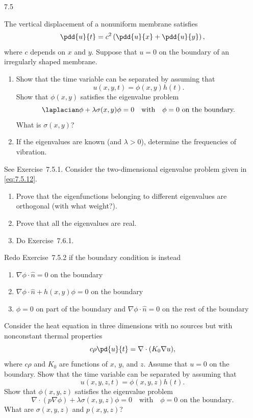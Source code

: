 \begin{exercises}{7.5}

\item The vertical displacement of a nonuniform membrane satisfies
\[
\pdd{u}{t} = c^2\left(\pdd{u}{x} + \pdd{u}{y}\right),
\]
where $c$ depends on $x$ and $y$.  Suppose that $u = 0$ on the boundary of an irregularly shaped membrane.

\begin{enumerate}
\item[(a)] Show that the time variable can be separated by assuming that
\[
u(x,y,t) = \phi(x,y)h(t).
\]
Show that $\phi(x,y)$ satisfies the eigenvalue problem
\begin{equation}
\laplacian\phi + \lambda\sigma(x,y)\phi = 0 \quad\text{with}\quad \phi = 0 \text{ on the boundary.}
\label{eq:7.5.12}
\end{equation}
What is $\sigma(x,y)$?

\item[(b)] If the eigenvalues are known (and $\lambda > 0$), determine the frequencies of vibration.
\end{enumerate}

\item See Exercise~7.5.1.  Consider the two-dimensional eigenvalue problem given in \eqref{eq:7.5.12}.

\begin{enumerate}
\item[(a)] Prove that the eigenfunctions belonging to different eigenvalues are orthogonal (with what weight?).

\item[(b)] Prove that all the eigenvalues are real.

\item[(c)] Do Exercise~7.6.1.
\end{enumerate}

\item Redo Exercise~7.5.2 if the boundary condition is instead
\begin{enumerate}
\item[(a)] $\nabla\phi\cdot\hat{n} = 0$ on the boundary
\item[(b)] $\nabla\phi\cdot\hat{n} + h(x,y)\phi = 0$ on the boundary
\item[(c)] $\phi = 0$ on part of the boundary and $\nabla\phi\cdot\hat{n} = 0$ on the rest of the boundary
\end{enumerate}

\item Consider the heat equation in three dimensions with no sources but with nonconstant thermal properties
\[
c\rho\pd{u}{t} = \nabla\cdot(K_0\nabla u),
\]
where $c\rho$ and $K_0$ are functions of $x$, $y$, and $z$.  Assume that $u = 0$ on the boundary.  Show that the time variable can be separated by assuming that
\[
u(x,y,z,t) = \phi(x,y,z)h(t).
\]
Show that $\phi(x,y,z)$ satisfies the eigenvalue problem
\begin{equation}
\nabla\cdot(p\nabla\phi) + \lambda\sigma(x,y,z)\phi = 0 \quad\text{with}\quad \phi = 0 \text{ on the boundary.}
\label{eq:7.5.13}
\end{equation}
What are $\sigma(x,y,z)$ and $p(x,y,z)$?


\end{exercises}
